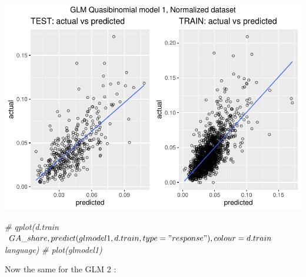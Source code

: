 \documentclass[
]{article}
\newenvironment{Shaded}{\begin{snugshade}}{\end{snugshade}}
\newcommand{\CommentTok}[1]{\textcolor[rgb]{0.56,0.35,0.01}{\textit{#1}}}
\begin{document}
\includegraphics{Lin_Mod_Clus_Analysis_files/figure-latex/unnamed-chunk-35-1.pdf}

\begin{Shaded}
\begin{Highlighting}[]
\CommentTok{\# qplot(d.train$GA\_share, predict(glmodel1, d.train, type="response"), colour = d.train$language)}
\CommentTok{\# plot(glmodel1)}
\end{Highlighting}
\end{Shaded}

Now the same for the GLM 2 :
\end{document}
